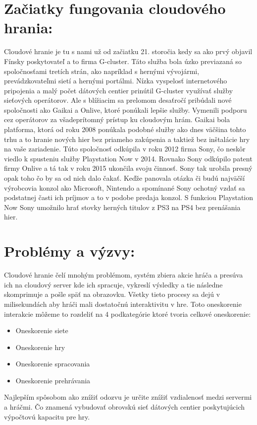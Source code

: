 \documentclass[10pt,twoside,slovak,a4paper]{article}
\begin{document}
\section{Začiatky fungovania cloudového hrania:} 
Cloudové hranie je tu s nami už od začiatku 21. storočia kedy sa ako prvý objavil Fínsky poskytovateľ a to firma G-cluster. Táto služba bola úzko previazaná so spoločnosťami tretích strán, ako napríklad s hernými vývojármi, prevádzkovateľmi sietí a hernými portálmi. Nízka vyspelosť internetového pripojenia a malý počet dátových centier prinútil G-cluster využívať služby sieťových operátorov. Ale s blížiacim sa prelomom desaťročí pribúdali nové spoločnosti ako Gaikai a Onlive, ktoré ponúkali lepšie služby. Vymenili podporu cez operátorov za všadeprítomný prístup ku cloudovým hrám. Gaikai bola platforma, ktorá od roku 2008 ponúkala podobné služby ako dnes väčšina tohto trhu a to hranie nových hier bez priameho zakúpenia a taktiež bez inštalácie hry na vaše zariadenie. Túto spoločnosť odkúpila v roku 2012 firma Sony, čo neskôr viedlo k spusteniu služby Playstation Now v 2014. Rovnako Sony odkúpilo patent firmy Onlive a tá tak v roku 2015 ukončila svoju činnosť. Sony tak urobila presný opak toho čo by sa od nich dalo čakať. Keďže panovala otázka či budú najväčší výrobcovia konzol ako Microsoft, Nintendo a spomínané Sony ochotný vzdať sa podstatnej časti ich príjmov a to v podobe predaja konzol. S funkciou Playstation Now Sony umožnilo hrať stovky herných titulov z PS3 na PS4 bez prenášania hier.~\cite{2}

\section{Problémy a výzvy:} 
Cloudové hranie čelí mnohým problémom, systém zbiera akcie hráča a presúva ich na cloudový server kde ich spracuje, vykreslí výsledky a tie následne skomprimuje a pošle späť na obrazovku. Všetky tieto procesy sa dejú v milisekundách aby hráči mali dostatočnú interaktivitu v hre. Toto oneskorenie interakcie môžeme to rozdeliť na 4 podkategórie ktoré tvoria celkové oneskorenie:

\begin{itemize}
\item Oneskorenie siete
\item Oneskorenie hry
\item Oneskorenie spracovania
\item Oneskorenie prehrávania
\end{itemize}
Najlepším spôsobom ako znížiť odozvu je určite znížiť vzdialenosť medzi servermi a hráčmi. Čo znamená vybudovať obrovskú sieť dátových centier poskytujúcich výpočtovú kapacitu pre hry.
\end{document}

